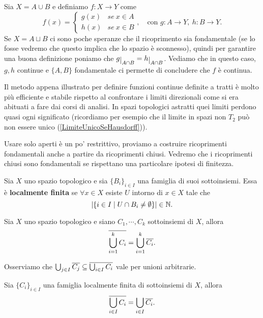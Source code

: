 \begin{multicols*}{2}
\begin{remark}
Sia $X=A\cup B$ e definiamo $f:X\to Y$ come
\[f(x)=\begin{cases}
g(x) &se\ x\in A\\
h(x) &se\ x\in B
\end{cases},\quad \text{con }g:A\to Y,\ h:B\to Y.\]
Se $X=A\sqcup B$ ci sono poche speranze che il ricoprimento sia fondamentale (se lo fosse vedremo che questo implica che lo spazio è sconnesso), quindi per garantire una buona definizione poniamo che $g\res{A\cap B}=h\res{A\cap B}$. Vediamo che in questo caso, $g,h$ continue e $\{A,B\}$ fondamentale ci permette di concludere che $f$ è continua.
\end{remark}
\begin{remark}
Il metodo appena illustrato per definire funzioni continue definite a tratti è molto più efficiente e stabile rispetto al confrontare i limiti direzionali come si era abituati a fare dai corsi di analisi. In spazi topologici astratti quei limiti perdono quasi ogni significato (ricordiamo per esempio che il limite in spazi non $T_2$ può non essere unico (\ref{LimiteUnicoSeHausdorff})).
\end{remark}
\vspace{0.5cm}

\noindent
Usare solo aperti è un po' restrittivo, proviamo a costruire ricoprimenti fondamentali anche a partire da ricoprimenti chiusi. Vedremo che i ricoprimenti chiusi sono fondamentali se rispettano una particolare ipotesi di finitezza.

\begin{definition}
Sia $X$ uno spazio topologico e sia $\{B_i\}_{i\in I}$ una famiglia di suoi sottoinsiemi. Essa è \textbf{localmente finita} se $\forall x\in X$ esiste $U$ intorno di $x\in X$ tale che \[|\{i\in I\mid U\cap B_i\neq\emptyset\}|\in \mathbb{N}.\]
\end{definition}

\begin{lemma}
Sia $X$ uno spazio topologico e siano $C_1,\cdots, C_k$ sottoinsiemi di $X$, allora
\[\overline{\bigcup_{i=1}^kC_i}=\bigcup_{i=1}^k\overline{C_i}.\]
\end{lemma}
\begin{remark}
Osserviamo che $\bigcup_{j\in I}\overline{C_j}\subseteq \overline{\bigcup_{i\in I}C_i}$ vale per unioni arbitrarie.
\end{remark}

\begin{lemma}\label{ChiusuraEUnioneLocalmenteFinitaCommutano}
Sia $\{C_i\}_{i\in I}$ una famiglia localmente finita di sottoinsiemi di $X$, allora
\[\overline{\bigcup_{i\in I}C_i}=\bigcup_{i\in I}\overline{C_i}.\]
\end{lemma}


\end{multicols*}

